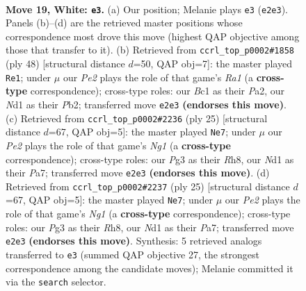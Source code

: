 \documentclass[11pt]{article}
\begin{document}
\clearpage

\begin{figure}[p]\centering
\begin{subfigure}{0.46\textwidth}\centering
\resizebox{\linewidth}{!}{%
\newchessgame
\chessboard[
  setfen={1nb2rk1/r5b1/1p2pn2/p1p2p2/2P3p1/1P4P1/P2NPPB1/1RBNR1K1 w - - 0 19},
  showmover=false,
  pgfstyle=straightmove, color=movearrow, markmove={e2-e3}
]}
\caption{}
\end{subfigure}\hfill
\begin{subfigure}{0.46\textwidth}\centering
\resizebox{\linewidth}{!}{%
\newchessgame
\chessboard[
  setfen={r4rk1/p1p3bb/1p1p1n1p/3Pp3/2P4N/2N2PP1/PP1B1R1P/R5K1 w - - 2 25},
  showmover=false,
  pgfstyle=straightmove, color=movearrow, markmove={a1-e1}
]}
\caption{}
\end{subfigure}
\\[4pt]
\begin{subfigure}{0.46\textwidth}\centering
\resizebox{\linewidth}{!}{%
\newchessgame
\chessboard[
  setfen={r3kbnr/pp3pp1/4p2p/3pP2P/1n1P4/8/PP1NNPP1/R1B2K1R b kq - 2 13},
  showmover=false,
  pgfstyle=straightmove, color=movearrow, markmove={g8-e7}
]}
\caption{}
\end{subfigure}\hfill
\begin{subfigure}{0.46\textwidth}\centering
\resizebox{\linewidth}{!}{%
\newchessgame
\chessboard[
  setfen={r3kbnr/pp3pp1/4p2p/3pP2P/1n1P4/8/PP1NNPP1/R1B2K1R b kq - 2 13},
  showmover=false,
  pgfstyle=straightmove, color=movearrow, markmove={g8-e7}
]}
\caption{}
\end{subfigure}
\caption{\textbf{Move 19, White: \texttt{e3}.} (a) Our position; Melanie plays \texttt{e3} (\texttt{e2e3}). Panels (b)--(d) are the retrieved master positions whose correspondence most drove this move (highest QAP objective among those that transfer to it). (b) Retrieved from \texttt{ccrl\_top\_p0002\#1858} (ply 48) [structural distance $d$=50, QAP obj=7]: the master played \texttt{Re1}; under $\mu$ our \emph{Pe2} plays the role of that game's \emph{Ra1} (a \textbf{cross-type} correspondence); cross-type roles: our \emph{B}c1 as their \emph{P}a2, our \emph{N}d1 as their \emph{P}b2; transferred move \texttt{e2e3} \textbf{(endorses this move)}. (c) Retrieved from \texttt{ccrl\_top\_p0002\#2236} (ply 25) [structural distance $d$=67, QAP obj=5]: the master played \texttt{Ne7}; under $\mu$ our \emph{Pe2} plays the role of that game's \emph{Ng1} (a \textbf{cross-type} correspondence); cross-type roles: our \emph{P}g3 as their \emph{R}h8, our \emph{N}d1 as their \emph{P}a7; transferred move \texttt{e2e3} \textbf{(endorses this move)}. (d) Retrieved from \texttt{ccrl\_top\_p0002\#2237} (ply 25) [structural distance $d$=67, QAP obj=5]: the master played \texttt{Ne7}; under $\mu$ our \emph{Pe2} plays the role of that game's \emph{Ng1} (a \textbf{cross-type} correspondence); cross-type roles: our \emph{P}g3 as their \emph{R}h8, our \emph{N}d1 as their \emph{P}a7; transferred move \texttt{e2e3} \textbf{(endorses this move)}. Synthesis: 5 retrieved analogs transferred to \texttt{e3} (summed QAP objective 27, the strongest correspondence among the candidate moves); Melanie committed it via the \texttt{search} selector.}
\label{fig:thought-m36}
\end{figure}
\end{document}
